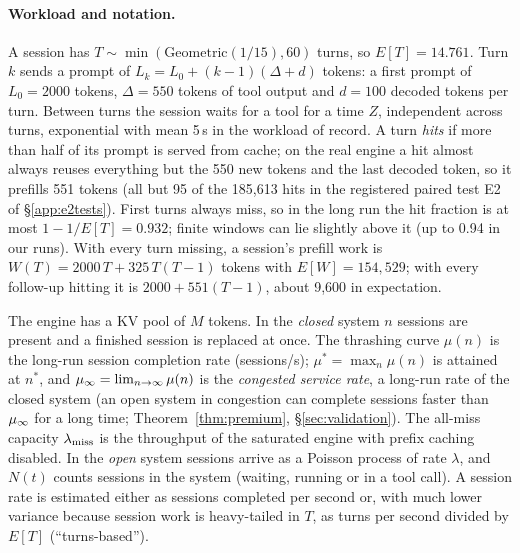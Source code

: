 \paragraph{Workload and notation.}\label{sec:notation}
A session has $T\sim\min(\mathrm{Geometric}(1/15),60)$ turns, so $E[T]=14.761$. Turn $k$ sends a prompt of $L_k=L_0+(k-1)(\Delta+d)$ tokens: a first prompt of $L_0=2000$ tokens, $\Delta=550$ tokens of tool output and $d=100$ decoded tokens per turn. Between turns the session waits for a tool for a time $Z$, independent across turns, exponential with mean 5\,s in the workload of record. A turn \emph{hits} if more than half of its prompt is served from cache; on the real engine a hit almost always reuses everything but the 550 new tokens and the last decoded token, so it prefills 551 tokens (all but 95 of the 185,613 hits in the registered paired test E2 of \S\ref{app:e2tests}). First turns always miss, so in the long run the hit fraction is at most $1-1/E[T]=0.932$; finite windows can lie slightly above it (up to 0.94 in our runs). With every turn missing, a session's prefill work is $W(T)=2000\,T+325\,T(T-1)$ tokens with $E[W]=154{,}529$; with every follow-up hitting it is $2000+551(T-1)$, about 9,600 in expectation.

The engine has a KV pool of $M$ tokens. In the \emph{closed} system $n$ sessions are present and a finished session is replaced at once. The thrashing curve $\mu(n)$ is the long-run session completion rate (sessions/s); $\mu^*=\max_n\mu(n)$ is attained at $n^*$, and $\mu_{\infty}=\lim_{n\to\infty}\mu(n)$ is the \emph{congested service rate}, a long-run rate of the closed system (an open system in congestion can complete sessions faster than $\mu_{\infty}$ for a long time; Theorem~\ref{thm:premium},
\S\ref{sec:validation}). The all-miss capacity $\lambda_{\mathrm{miss}}$ is the throughput of the saturated engine with prefix caching disabled. In the \emph{open} system sessions arrive as a Poisson process of rate $\lambda$, and $N(t)$ counts sessions in the system (waiting, running or in a tool call). A session rate is estimated either as sessions completed per second or, with much lower variance because session work is heavy-tailed in $T$, as turns per second divided by $E[T]$ (``turns-based'').

